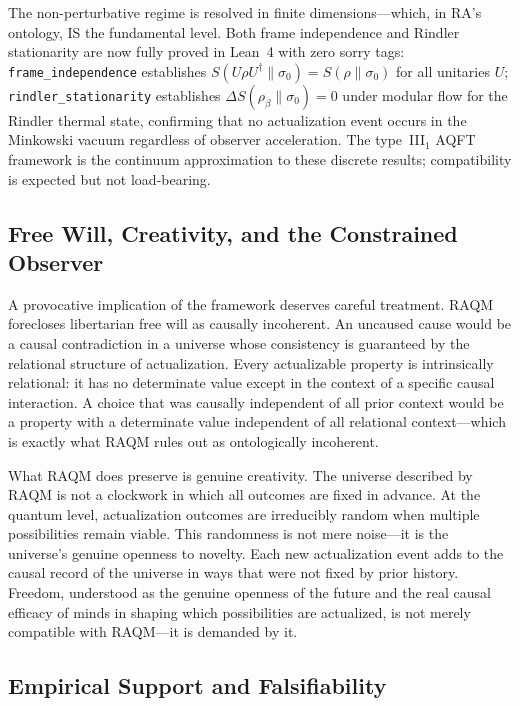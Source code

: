 \documentclass[11pt,a4paper]{article}
\theoremstyle{plain}
\theoremstyle{definition}
\theoremstyle{remark}
\begin{document}
The non-perturbative regime is resolved in finite dimensions---which,
in RA's ontology, IS the fundamental level. Both frame independence and
Rindler stationarity are now fully proved in Lean~4 with zero sorry tags:
\texttt{frame\_independence} establishes $S(U\rho U^\dagger\|\sigma_0)
= S(\rho\|\sigma_0)$ for all unitaries $U$; \texttt{rindler\_stationarity}
establishes $\Delta S(\rho_\beta\|\sigma_0) = 0$ under modular flow for
the Rindler thermal state, confirming that no actualization event occurs
in the Minkowski vacuum regardless of observer acceleration.
The type~III$_1$ AQFT framework is the continuum approximation to these
discrete results; compatibility is expected but not load-bearing.

\subsection{Free Will, Creativity, and the Constrained Observer}

A provocative implication of the framework deserves careful treatment. RAQM
forecloses libertarian free will as causally incoherent. An uncaused cause would
be a causal contradiction in a universe whose consistency is guaranteed by the
relational structure of actualization. Every actualizable property is intrinsically
relational: it has no determinate value except in the context of a specific causal
interaction. A choice that was causally independent of all prior context would be a
property with a determinate value independent of all relational context---which is
exactly what RAQM rules out as ontologically incoherent.

What RAQM does preserve is genuine creativity. The universe described by RAQM is
not a clockwork in which all outcomes are fixed in advance. At the quantum level,
actualization outcomes are irreducibly random when multiple possibilities remain
viable. This randomness is not mere noise---it is the universe's genuine openness
to novelty. Each new actualization event adds to the causal record of the universe
in ways that were not fixed by prior history. Freedom, understood as the genuine
openness of the future and the real causal efficacy of minds in shaping which
possibilities are actualized, is not merely compatible with RAQM---it is demanded
by it.

\subsection{Empirical Support and Falsifiability}
\label{sec:falsify}
\end{document}
